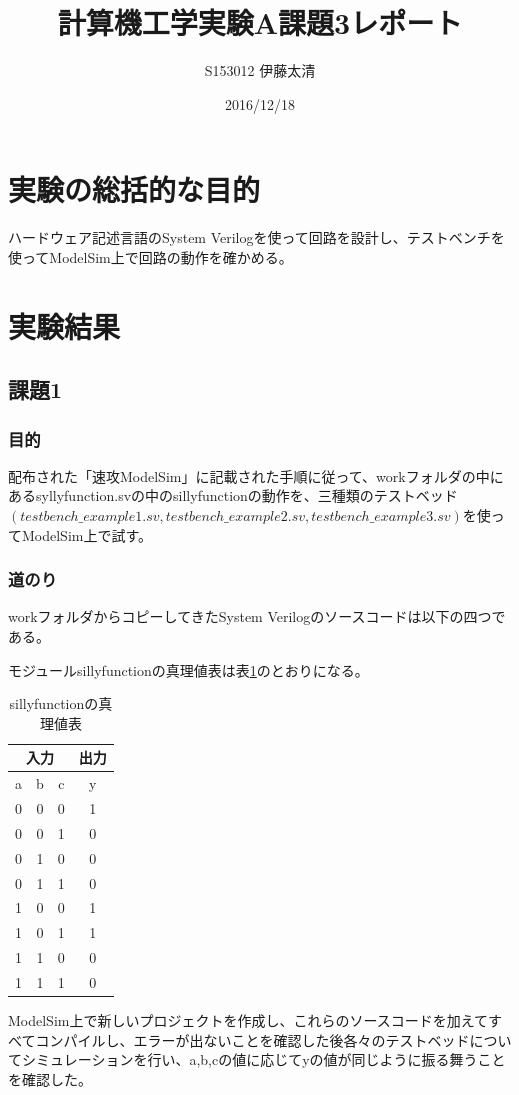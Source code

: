 \documentclass[a4paper]{jarticle}
\title{計算機工学実験A課題3レポート}
\author{S153012  伊藤太清}
\date{2016/12/18}
\begin{document}
\maketitle
\section{実験の総括的な目的}
ハードウェア記述言語のSystem Verilogを使って回路を設計し、テストベンチを使ってModelSim上で回路の動作を確かめる。
\section{実験結果}
\subsection{課題1}
\subsubsection{目的}
配布された「速攻ModelSim」に記載された手順に従って、workフォルダの中にあるsyllyfunction.svの中のsillyfunctionの動作を、三種類のテストベッド$(testbench\_example1.sv,testbench\_example2.sv,testbench\_example3.sv)$を使ってModelSim上で試す。
\subsubsection{道のり}
workフォルダからコピーしてきたSystem Verilogのソースコードは以下の四つである。




モジュールsillyfunctionの真理値表は表\ref{Work1TruthTable}のとおりになる。
\begin{table}[ht]
	\begin{center}
		\caption{sillyfunctionの真理値表}
		\label{Work1TruthTable}
		\begin{tabular}{|c|c|c||c|}
			\hline
			\multicolumn{3}{|c|}{入力} & \multicolumn{1}{|c|}{出力}\\ \hline\hline
			a	&b	&c	&y\\	\hline\hline
			0	&0	&0	&1\\	\hline
			0	&0	&1	&0\\	\hline
			0	&1	&0	&0\\	\hline
			0	&1	&1	&0\\	\hline
			1	&0	&0	&1\\	\hline
			1	&0	&1	&1\\	\hline
			1	&1	&0	&0\\	\hline
			1	&1	&1	&0\\	\hline
		\end{tabular}
	\end{center}
\end{table}
ModelSim上で新しいプロジェクトを作成し、これらのソースコードを加えてすべてコンパイルし、エラーが出ないことを確認した後各々のテストベッドについてシミュレーションを行い、a,b,cの値に応じてyの値が同じように振る舞うことを確認した。
\end{document}
